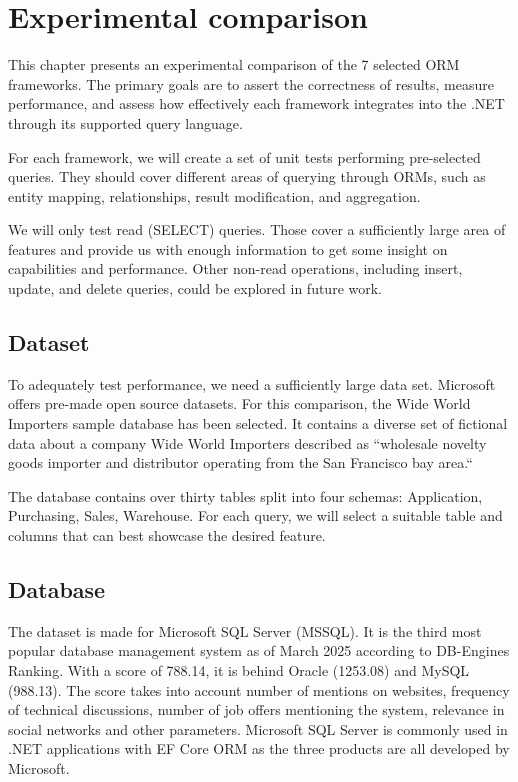 \chapter{Experimental comparison}

This chapter presents an experimental comparison of the 7 selected ORM frameworks. 
The primary goals are to assert the correctness of results, measure performance, and assess how effectively each framework integrates into the .NET through its supported query language.

For each framework, we will create a set of unit tests performing pre-selected queries. They should cover different areas of querying through ORMs, such as entity mapping, relationships, result modification, and aggregation.

We will only test read (SELECT) queries. Those cover a sufficiently large area of features and provide us with enough information to get some insight on capabilities and performance. Other non-read operations, including insert, update, and delete queries, could be explored in future work.

\section{Dataset}\label{sec:dataset}
To adequately test performance, we need a sufficiently large data set. Microsoft offers pre-made open source datasets.
For this comparison, the Wide World Importers sample database \cite{microsoftWWI} has been selected.
It contains a diverse set of fictional data about a company Wide World Importers described as ``wholesale novelty goods importer and distributor operating from the San Francisco bay area.``\cite{microsoftWWI}

The database contains over thirty tables split into four schemas: Application, Purchasing, Sales, Warehouse. For each query, we will select a suitable table and columns that can best showcase the desired feature.

\section{Database}\label{sec:database}
The dataset is made for Microsoft SQL Server (MSSQL). It is the third most popular database management system as of March 2025 according to DB-Engines Ranking\cite{DBEngines2025Ranking}. With a score of 788.14, it is behind Oracle (1253.08) and MySQL (988.13). The score takes into account number of mentions on websites, frequency of technical discussions, number of job offers mentioning the system, relevance in social networks and other parameters.\cite{DBEnginesRankingMetrics} 
Microsoft SQL Server is commonly used in .NET applications with EF Core ORM as the three products are all developed by Microsoft.  

